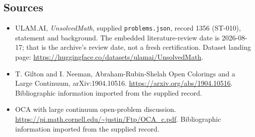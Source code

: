 \documentclass[11pt,a4paper]{article}
\begin{document}
\subsection{Sources}

{\small

\begin{itemize}

\item[\hypertarget{source:1356:1}{S1}] ULAM.AI, \emph{UnsolvedMath}, supplied \texttt{problems.json}, record 1356 (ST-010), statement and background. The embedded literature-review date is 2026-08-17; that is the archive’s review date, not a fresh certification. Dataset landing page: \url{https://huggingface.co/datasets/ulamai/UnsolvedMath}.

\item[\hypertarget{source:1356:2}{S2}] T. Gilton and I. Neeman, Abraham-Rubin-Shelah Open Colorings and a Large Continuum, arXiv:1904.10516. \url{https://arxiv.org/abs/1904.10516}. Bibliographic information imported from the supplied record.

\item[\hypertarget{source:1356:3}{S3}] OCA with large continuum open-problem discussion. \url{https://pi.math.cornell.edu/~justin/Ftp/OCA_c.pdf}. Bibliographic information imported from the supplied record.

\end{itemize}

}

\label{end:1356}
\end{document}
